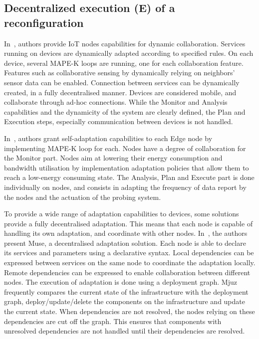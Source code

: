 \documentclass{article}
\begin{document}
\subsection{Decentralized execution (E) of a reconfiguration}

In~\cite{homeostatis2019tuning}, authors provide IoT nodes capabilities for dynamic collaboration. Services running on devices are dynamically adapted according to specified rules. On each device, several MAPE-K loops are running, one for each collaboration feature. Features such as collaborative sensing by dynamically relying on neighbors' sensor data can be enabled. Connection between services can be dynamically created, in a fully decentralised manner. Devices are considered mobile, and collaborate through ad-hoc connections. While the Monitor and Analysis capabilities and the dynamicity of the system are clearly defined, the Plan and Execution steps, especially communication between devices is not handled. 

In~\cite{colombo2022p2pmonitoring}, authors grant self-adaptation capabilities to each Edge node by implementing MAPE-K loop for each. Nodes have a degree of collaboration for the Monitor part. Nodes aim at lowering their energy consumption and bandwidth utilisation by implementation adaptation policies that allow them to reach a low-energy consuming state. The Analysis, Plan and Execute part is done individually on nodes, and consists in adapting the frequency of data report by the nodes and the actuation of the probing system.

To provide a wide range of adaptation capabilities to devices, some solutions provide a fully decentralised adaptation. This means that each node is capable of handling its own adaptation, and coordinate  with other nodes. In~\cite{sokolowski_mjuz_2021}, the authors present Muse, a decentralised adaptation solution. Each node is able to declare its services and parameters using a declarative syntax. Local dependencies can be expressed between services on the same node to coordinate the adaptation locally. Remote dependencies can be expressed to enable collaboration between different nodes. The execution of adaptation is done using a deployment graph. Mjuz frequently compares the current state of the infrastructure with the deployment graph, deploy/update/delete the components on the infrastructure and update the current state. When dependencies are not resolved, the nodes relying on these dependencies are cut off the graph. This ensures that components with unresolved dependencies are not handled until their dependencies are resolved.
\end{document}
